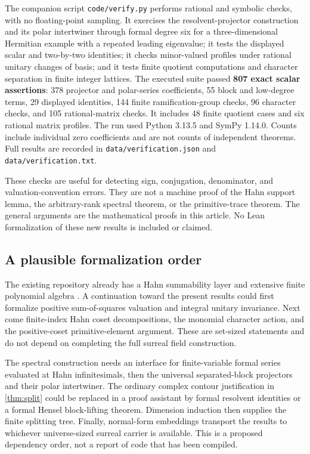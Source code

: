 \documentclass[11pt,letterpaper]{article}
\numberwithin{equation}{section}
\theoremstyle{definition}
\theoremstyle{remark}
\begin{document}
The companion script \texttt{code/verify.py} performs rational and symbolic
checks, with no floating-point sampling. It exercises the resolvent-projector
construction and its polar intertwiner through formal degree six for a
three-dimensional Hermitian example with a repeated leading eigenvalue;
it tests the displayed scalar and two-by-two identities; it checks
minor-valued profiles under rational unitary changes of basis; and it tests
finite quotient computations and character separation in finite integer
lattices. The executed suite passed \textbf{807 exact scalar assertions}: 378 projector
and polar-series coefficients, 55 block and low-degree terms, 29 displayed
identities, 144 finite ramification-group checks, 96 character checks, and
105 rational-matrix checks. It includes 48 finite quotient cases and six
rational matrix profiles. The run used Python 3.13.5 and SymPy 1.14.0.
Counts include individual zero coefficients and are not counts of independent
theorems. Full results are recorded in \texttt{data/verification.json} and
\texttt{data/verification.txt}.

These checks are useful for detecting sign, conjugation, denominator, and
valuation-convention errors. They are not a machine proof of the Hahn support
lemma, the arbitrary-rank spectral theorem, or the primitive-trace theorem.
The general arguments are the mathematical proofs in this article. No Lean
formalization of these new results is included or claimed.

\subsection{A plausible formalization order}

The existing repository already has a Hahn summability layer and extensive
finite polynomial algebra \cite{RepoMain}. A continuation toward the present
results could first formalize positive sum-of-squares valuation and integral
unitary invariance. Next come finite-index Hahn coset decompositions, the
monomial character action, and the positive-coset primitive-element argument.
These are set-sized statements and do not depend on completing the full
surreal field construction.

The spectral construction needs an interface for finite-variable formal
series evaluated at Hahn infinitesimals, then the universal separated-block
projectors and their polar intertwiner. The ordinary complex contour
justification in \cref{thm:split} could be replaced in a proof assistant by
formal resolvent identities or a formal Hensel block-lifting theorem.
Dimension induction then supplies the finite splitting tree. Finally,
normal-form embeddings transport the results to whichever universe-sized
surreal carrier is available. This is a proposed dependency order, not a
report of code that has been compiled.
\end{document}
